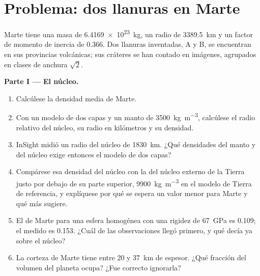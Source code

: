 \section{Problema: dos llanuras en Marte}

\begin{problem}
\label{pb:b3:planetary-interiors-surfaces:1}
Marte tiene una masa de \qty{6.4169e23}{kg}, un radio de \qty{3389.5}{km} y un
factor de momento de inercia de 0.366. Dos llanuras inventadas, A y B, se encuentran en
sus provincias volcánicas; sus cráteres se han contado en imágenes, agrupados en clases
de anchura $\sqrt2$.

\medskip\noindent\textbf{Parte I --- El núcleo.}
\begin{enumerate}
\item Calcúlese la densidad media de Marte.
\item Con un modelo de dos capas y un manto de \qty{3500}{kg.m^{-3}}, calcúlese
  el radio relativo del núcleo, su radio en kilómetros y su
  densidad.
\item InSight midió un radio del núcleo de \qty{1830}{km}. ¿Qué densidades del manto y del núcleo
  exige entonces el modelo de dos capas?
\item Compárese esa densidad del núcleo con la del núcleo externo de la Tierra
  justo por debajo de su parte superior, \qty{9900}{kg.m^{-3}} en el modelo de Tierra de referencia,
  y explíquese por qué se espera un valor menor para Marte y qué más
  sugiere.
\item El  de Marte para una esfera homogénea con una rigidez de
  \qty{67}{GPa} es 0.109; el medido es 0.153. ¿Cuál de las observaciones llegó
  primero, y qué decía ya sobre el núcleo?
\item La corteza de Marte tiene entre 20 y \qty{37}{km} de espesor. ¿Qué fracción del
  volumen del planeta ocupa? ¿Fue correcto ignorarla?
\end{enumerate}


\end{problem}
